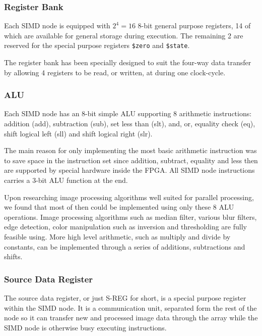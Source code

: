 \subsubsection{Register Bank}
Each \ac{SIMD} node is equipped with $2^4 = 16$ 8-bit general purpose registers, 14 of
which are available for general storage during execution. The remaining 2 are
reserved for the special purpose registers {\tt \$zero} and {\tt \$state}.



The register bank has been specially designed to suit the four-way data transfer by
allowing 4 registers to be read, or written, at during one clock-cycle.

\subsubsection{ALU}
Each \ac{SIMD} node has an 8-bit simple ALU supporting 8 arithmetic instructions: 
addition ({\sc add}), subtraction ({\sc sub}), set less than ({\sc slt}), {\sc and}, 
{\sc or}, equality check ({\sc eq}), shift logical left ({\sc sll}) and shift logical 
right ({\sc slr}). 

The main reason for only implementing the most basic arithmetic instruction was to save
space in the instruction set since addition, subtract, equality and less then are 
supported by special hardware inside the FPGA. All \ac{SIMD} node instructions carries
a 3-bit \ac{ALU} function at the end.

Upon researching image processing algorithms well suited for parallel processing, we
found that most of then could be implemented using only these 8 \ac{ALU} operations. 
Image processing algorithms such as median filter, various blur filters, edge detection, 
color manipulation such as inversion and thresholding are fully feasible using. More high
level arithmetic, such as multiply and divide by constants, can be implemented
through a series of additions, subtractions and shifts.


\subsubsection{Source Data Register}
The source data register, or just \ac{S-REG} for short, is a special purpose
register within the \ac{SIMD} node. It is a communication unit, separated form
the rest of the node so it can transfer new and processed image data through the
array while the \ac{SIMD} node is otherwise busy executing instructions.

